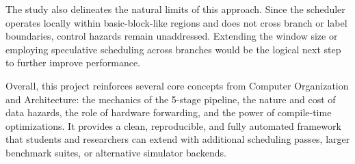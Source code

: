 \documentclass[11pt]{report}
\begin{document}
The study also delineates the natural limits of this approach. Since the scheduler operates locally within basic-block-like regions and does not cross branch or label boundaries, control hazards remain unaddressed. Extending the window size or employing speculative scheduling across branches would be the logical next step to further improve performance.

Overall, this project reinforces several core concepts from Computer Organization and Architecture: the mechanics of the 5-stage pipeline, the nature and cost of data hazards, the role of hardware forwarding, and the power of compile-time optimizations. It provides a clean, reproducible, and fully automated framework that students and researchers can extend with additional scheduling passes, larger benchmark suites, or alternative simulator backends.
\end{document}
